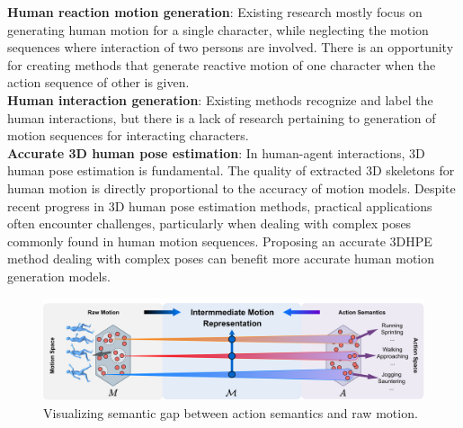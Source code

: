 \noindent
\textbf{Human reaction motion generation}: Existing research mostly focus on generating human motion for a single character, while neglecting the motion sequences where interaction of two persons are involved. There is an opportunity for creating methods that generate reactive motion of one character when the action sequence of other is given.\\

\noindent
\textbf{Human interaction generation}: Existing methods recognize and label the human interactions, but there is a lack of research pertaining to generation of motion sequences for interacting characters.\\

\noindent
\textbf{Accurate 3D human pose estimation}: In human-agent interactions, 3D human pose estimation is fundamental. The quality of extracted 3D skeletons for human motion is directly proportional to the accuracy of motion models. Despite recent progress in 3D human pose estimation methods, practical applications often encounter challenges, particularly when dealing with complex poses commonly found in human motion sequences. Proposing an accurate 3DHPE method dealing with complex poses can benefit more accurate human motion generation models.



\begin{figure}[!t]	
	\centering
	\includegraphics[width=1\textwidth]{figures/chapter1/fig_problem_statement_1}
	\caption{Visualizing semantic gap between action semantics and raw motion.}
	\label{fig_problem_statement_1}
\end{figure}

